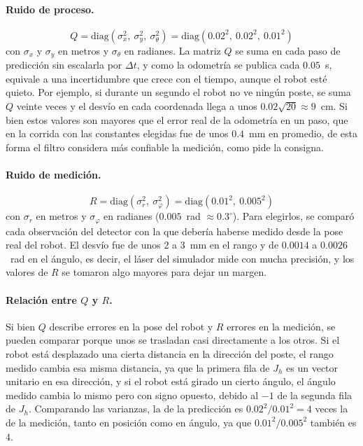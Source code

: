 \documentclass[11pt,a4paper]{article}
\begin{document}
\paragraph{Ruido de proceso.}
\begin{equation}
Q = \mathrm{diag}(\sigma_x^2,\ \sigma_y^2,\ \sigma_\theta^2) = \mathrm{diag}(0.02^2,\ 0.02^2,\ 0.01^2)
\end{equation}
con $\sigma_x$ y $\sigma_y$ en metros y $\sigma_\theta$ en radianes. La matriz $Q$ se suma en cada paso de predicción sin escalarla por $\Delta t$, y como la odometría se publica cada $0.05$~s, equivale a una incertidumbre que crece con el tiempo, aunque el robot esté quieto. Por ejemplo, si durante un segundo el robot no ve ningún poste, se suma $Q$ veinte veces y el desvío en cada coordenada llega a unos $0.02\sqrt{20} \approx 9$~cm. Si bien estos valores son mayores que el error real de la odometría en un paso, que en la corrida con las constantes elegidas fue de unos $0.4$~mm en promedio, de esta forma el filtro considera más confiable la medición, como pide la consigna.

\paragraph{Ruido de medición.}
\begin{equation}
R = \mathrm{diag}(\sigma_r^2,\ \sigma_\varphi^2) = \mathrm{diag}(0.01^2,\ 0.005^2)
\end{equation}
con $\sigma_r$ en metros y $\sigma_\varphi$ en radianes ($0.005$~rad $\approx 0.3^\circ$). Para elegirlos, se comparó cada observación del detector con la que debería haberse medido desde la pose real del robot. El desvío fue de unos $2$ a $3$~mm en el rango y de $0.0014$ a $0.0026$~rad en el ángulo, es decir, el láser del simulador mide con mucha precisión, y los valores de $R$ se tomaron algo mayores para dejar un margen.

\paragraph{Relación entre $Q$ y $R$.}
Si bien $Q$ describe errores en la pose del robot y $R$ errores en la medición, se pueden comparar porque unos se trasladan casi directamente a los otros. Si el robot está desplazado una cierta distancia en la dirección del poste, el rango medido cambia esa misma distancia, ya que la primera fila de $J_h$ es un vector unitario en esa dirección, y si el robot está girado un cierto ángulo, el ángulo medido cambia lo mismo pero con signo opuesto, debido al $-1$ de la segunda fila de $J_h$. Comparando las varianzas, la de la predicción es $0.02^2/0.01^2 = 4$ veces la de la medición, tanto en posición como en ángulo, ya que $0.01^2/0.005^2$ también es $4$.
\end{document}
